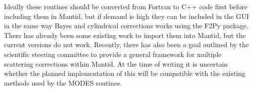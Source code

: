 \documentclass[paper=a4, fontsize=11pt]{scrartcl}	%
\numberwithin{equation}{section}															%
\numberwithin{figure}{section}																%
\numberwithin{table}{section}																%
\begin{document}
Ideally these routines should be converted from Fortran to C++ code first before including them in Mantid, but if demand is high they can be included in the GUI in the same way Bayes and cylindrical corrections works using the F2Py package. There has already been some existing work to import them into Mantid, but the current versions do not work. Recently, there has also been a goal outlined by the scientific steering committee to provide a general framework for multiple scattering corrections within Mantid. At the time of writing it is uncertain whether the planned implementation of this will be compatible with the existing methods used by the MODES routines.



\end{document}
